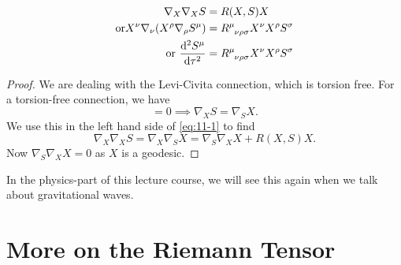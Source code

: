\begin{claim}
  \begin{align}
    \nabla_{X}\nabla_{X} S &= R(X, S) X \\
    \label{eq:11-1}
    \text{or} X^{\nu} \nabla_{\nu} (X^{\rho} \nabla_{\rho} S^{\mu}) &= R \indices{^{\mu}_{\nu\rho\sigma}} X^{\nu}X^{\rho} S^{\sigma} \\
    \text{or } \dv[2]{S^{\mu}}{\tau} &= R \indices{^{\mu}_{\nu\rho\sigma}} X^{\nu}X^{\rho} S^{\sigma} \label{eq:geodesic_deviation}
  \end{align}
\end{claim}
\begin{proof}
  We are dealing with the Levi-Civita connection, which is torsion free. For a torsion-free connection, we have
  \begin{equation}
    [X, S] = 0 \implies \nabla_{X}S = \nabla_{S}X.
  \end{equation}
  We use this in the left hand side of \eqref{eq:11-1} to find
  \begin{equation}
    \nabla_{X} \nabla_{X} S = \nabla_{X} \nabla_{S} X = \nabla_{S} \nabla_{X} X + R(X, S) X.
  \end{equation}
  Now $\nabla_{S} \nabla_{X} X = 0$ as $X$ is a geodesic.
\end{proof}
\begin{leftbar}
  \begin{remark}
    In the physics-part of this lecture course, we will see this again when we talk about gravitational waves.
  \end{remark}
\end{leftbar}

\section{More on the Riemann Tensor}%
\label{sec:more_on_the_riemann_tensor}

